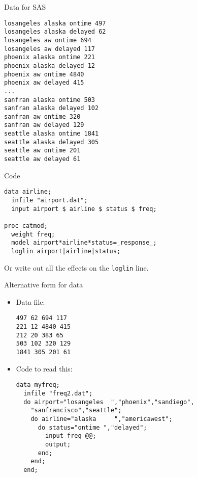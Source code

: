 \documentclass[pdf]{prosper}
\begin{document}
\begin{slide}{Data for SAS}

\begin{verbatim}
losangeles alaska ontime 497
losangeles alaska delayed 62
losangeles aw ontime 694
losangeles aw delayed 117
phoenix alaska ontime 221
phoenix alaska delayed 12
phoenix aw ontime 4840
phoenix aw delayed 415
...
sanfran alaska ontime 503
sanfran alaska delayed 102
sanfran aw ontime 320
sanfran aw delayed 129
seattle alaska ontime 1841
seattle alaska delayed 305
seattle aw ontime 201
seattle aw delayed 61
\end{verbatim}
  
\end{slide}

\begin{slide}{Code}

\begin{verbatim}
data airline;
  infile "airport.dat";
  input airport $ airline $ status $ freq;

proc catmod;
  weight freq;
  model airport*airline*status=_response_;
  loglin airport|airline|status;

\end{verbatim}

Or write out all the effects on the \verb-loglin- line.
  
\end{slide}

\begin{slide}{Alternative form for data}

  \begin{itemize}
  \item Data file:

\begin{verbatim}
497 62 694 117
221 12 4840 415
212 20 383 65
503 102 320 129
1841 305 201 61
\end{verbatim}


  \item Code to read this:

\begin{verbatim}
data myfreq;
  infile "freq2.dat";
  do airport="losangeles  ","phoenix","sandiego",
    "sanfrancisco","seattle";
    do airline="alaska     ","americawest";
      do status="ontime ","delayed";
        input freq @@;
        output;
      end;
    end;
  end;

\end{verbatim}
  \end{itemize}
  
\end{slide}
\end{document}
